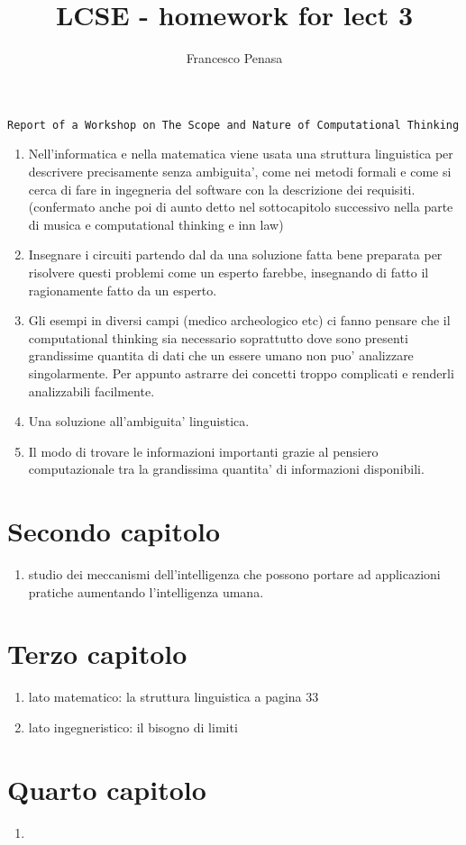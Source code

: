 \documentclass[11pt]{article}
\begin{document}
\author{Francesco Penasa}
\title{LCSE - homework for lect 3}
\maketitle

\medskip


\texttt{Report of a Workshop on The Scope and Nature of Computational Thinking}
\begin{enumerate}
	\item Nell'informatica e nella matematica viene usata una struttura linguistica per descrivere precisamente senza ambiguita', come nei metodi formali e come si cerca di fare in ingegneria del software con la descrizione dei requisiti. (confermato anche poi di aunto detto nel sottocapitolo successivo nella parte di musica e computational thinking e inn law)
	\item Insegnare i circuiti partendo dal da una soluzione fatta bene preparata per risolvere questi problemi come un esperto farebbe, insegnando di fatto il ragionamente fatto da un esperto.
	\item Gli esempi in diversi campi (medico archeologico etc) ci fanno pensare che il computational thinking sia necessario soprattutto dove sono presenti grandissime quantita di dati che un essere umano non puo' analizzare singolarmente. Per appunto astrarre dei concetti troppo complicati e renderli analizzabili facilmente.
	\item Una soluzione all'ambiguita' linguistica.
	\item Il modo di trovare le informazioni importanti grazie al pensiero computazionale tra la grandissima quantita' di informazioni disponibili.
\end{enumerate}


\section{Secondo capitolo} %
\label{sec:secondo_capitolo}
\begin{enumerate}
	\item studio dei meccanismi dell'intelligenza che possono portare ad applicazioni pratiche aumentando l'intelligenza umana.
\end{enumerate}


\section{Terzo capitolo} %
\label{sec:terzo_capitolo}
\begin{enumerate}
	\item lato matematico: la struttura linguistica a pagina 33
	\item lato ingegneristico: il bisogno di limiti
\end{enumerate}

\section{Quarto capitolo} %
\label{sec:quarto_capitolo}
\begin{enumerate}
	\item 
\end{enumerate}
\end{document}
